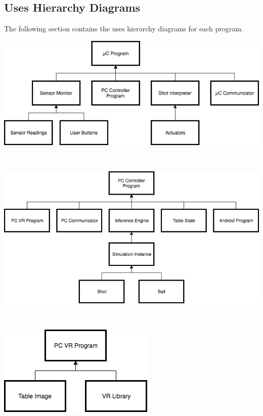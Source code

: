 \documentclass[titlepage]{article}
\begin{document}
\subsection{Uses Hierarchy Diagrams}
The following section contains the uses hierarchy diagrams for each program.
\begin{center}
	\includegraphics[scale = 0.75]{uCUsesHierarchy.png}
\label{fig:ucuses hierarchy diagram}
\end{center}~\\
\begin{center}
	\includegraphics[scale = 0.75]{PCControllerUsesHierarchy.png}
\label{fig:pc controller uses hierarchy diagram}
\end{center}~\\
\begin{center}
	\includegraphics[scale = 0.75]{PCVRUsesHierarchy.png}
\label{fig:pc vr uses hierarchy diagram}
\end{center}~\\
\end{document}
